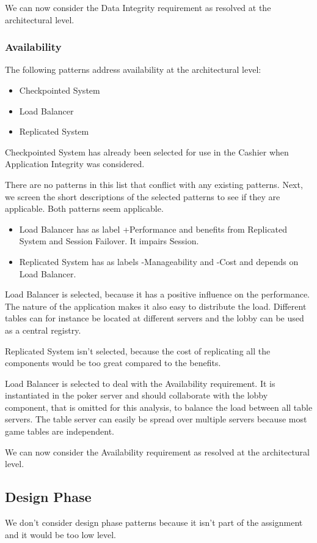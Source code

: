 \documentclass[a4paper,11pt]{report}
\begin{document}
We can now consider the Data Integrity requirement as resolved at the architectural level.
\subsubsection{Availability}
The following patterns address availability at the architectural level:
\begin{itemize}
\item Checkpointed System
\item Load Balancer
\item Replicated System
\end{itemize}

Checkpointed System has already been selected for use in the Cashier when Application Integrity was considered.

There are no patterns in this list that conflict with any existing patterns.
Next, we screen the short descriptions of the selected patterns to see if they are applicable. Both patterns seem
applicable.

\begin{itemize}
\item Load Balancer has as label +Performance and benefits from Replicated System and Session Failover. It impairs
Session.
\item Replicated System has as labels -Manageability and -Cost and depends on Load Balancer.
\end{itemize}

Load Balancer is selected, because it has a positive influence on the performance. The nature of the application
makes it also easy to distribute the load. Different tables can for instance be located at different servers and the lobby can be used as a central registry.

Replicated System isn't selected, because the cost of replicating all the components would be too great compared
to the benefits.

Load Balancer is selected to deal with the Availability requirement. It is instantiated in the poker server and should collaborate with the lobby component, that is omitted for this analysis, to balance the load between all table servers. The table server can easily be spread over multiple servers because most game tables are independent.

We can now consider the Availability requirement as resolved at the architectural level.

\subsection{Design Phase}
We don't consider design phase patterns because it isn't part of the assignment and it would be too
low level.
\end{document}
